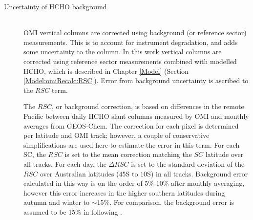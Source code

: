 \begin{description}
        
      \item [Uncertainty of HCHO background] \hfill \\
        OMI vertical columns are corrected using background (or reference sector) measurements.
        This is to account for instrument degradation, and adds some uncertainty to the column.
        In this work vertical columns are corrected using reference sector measurements combined with modelled HCHO, which is described in Chapter \ref{Model} (Section \ref{Model:omiRecalc:RSC}).
        Error from background uncertainty is ascribed to the $RSC$ term.
        
        The $RSC$, or background correction, is based on differences in the remote Pacific between daily HCHO slant columns measured by OMI and monthly averages from GEOS-Chem.
        The correction for each pixel is determined per latitude and OMI track; however, a couple of conservative simplifications are used here to estimate the error in this term.
        For each SC, the $RSC$ is set to the mean correction matching the $SC$ latitude over all tracks.
        For each day, the $\Delta RSC$ is set to the standard deviation of the $RSC$ over Australian latitudes ($45$\degr S to $10$\degr S) in all tracks.
        Background error calculated in this way is on the order of 5\%-10\% after monthly averaging, however this error increases in the higher southern latitudes during autumn and winter to $\sim{15}\%$.
        For comparison, the background error is assumed to be 15\% in \textcite{Curci2010} following \parencite{Dufour2009}.
        

\end{description}
